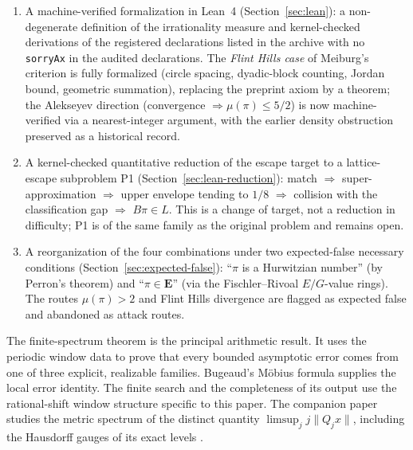 \documentclass[11pt]{amsart}
\theoremstyle{definition}
\theoremstyle{remark}
\numberwithin{equation}{section}
\newcommand{\irr}{\mu}
\begin{document}
\begin{enumerate}
\item A machine-verified formalization in Lean~4 (Section~\ref{sec:lean}): a non-degenerate definition of the irrationality measure and kernel-checked derivations of the registered declarations listed in the archive with no \texttt{sorryAx} in the audited declarations. The \emph{Flint Hills case} of Meiburg's criterion is fully formalized (circle spacing, dyadic-block counting, Jordan bound, geometric summation), replacing the preprint axiom by a theorem; the Alekseyev direction (convergence $\Rightarrow\irr(\pi)\le5/2$) is now machine-verified via a nearest-integer argument, with the earlier density obstruction preserved as a historical record.
\item A kernel-checked quantitative reduction of the escape target to a lattice-escape subproblem P1 (Section~\ref{sec:lean-reduction}): match $\Rightarrow$ super-approximation $\Rightarrow$ upper envelope tending to $1/8$ $\Rightarrow$ collision with the classification gap $\Rightarrow$ $B\pi\in L$. This is a change of target, not a reduction in difficulty; P1 is of the same family as the original problem and remains open.
\item A reorganization of the four combinations under two expected-false necessary conditions (Section~\ref{sec:expected-false}): ``$\pi$ is a Hurwitzian number'' (by Perron's theorem) and ``$\pi\in\mathbf{E}$'' (via the Fischler--Rivoal $E/G$-value rings). The routes $\irr(\pi)>2$ and Flint Hills divergence are flagged as expected false and abandoned as attack routes.
\end{enumerate}

The finite-spectrum theorem is the principal arithmetic result. It uses the
periodic window data to prove that every bounded asymptotic error comes from
one of three explicit, realizable families. Bugeaud's M\"obius formula
\cite[eq.~(3.4)]{BugeaudQuad} supplies the local error identity. The finite
search and the completeness of its output use the rational-shift window
structure specific to this paper. The companion paper studies the metric
spectrum of the distinct quantity $\limsup_j j\|Q_jx\|$, including the
Hausdorff gauges of its exact levels \cite{CompanionGauge}.
\end{document}
